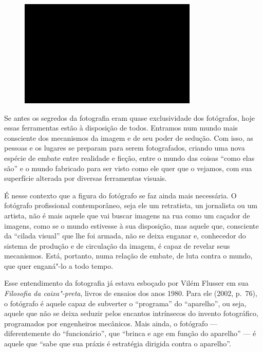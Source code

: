 \begin{figure}[!ht]

\centering
 \includegraphics[width=85mm]{./imgs/im1.jpg}
\caption{\tiny{}}

\end{figure}

Se antes os segredos da fotografia eram quase exclusividade dos fotógrafos, hoje essas ferramentas estão à disposição de todos. Entramos num mundo mais consciente dos mecanismos da imagem e de seu poder de sedução. Com isso, as pessoas e os lugares se preparam para serem fotografados, criando uma nova espécie de embate entre realidade e ficção, entre o mundo das coisas ``como elas são'' e o mundo fabricado para ser visto como ele quer que o vejamos, com sua superfície alterada por diversas ferramentas visuais. 

É nesse contexto que a figura do fotógrafo se faz ainda mais necessária. O fotógrafo profissional contemporâneo, seja ele um retratista, un jornalista ou um artista, não é mais aquele que vai buscar imagens na rua como um caçador de imagens, como se o mundo estivesse à sua disposição, mas aquele que, consciente da ``cilada visual'' que lhe foi armada, não se deixa enganar e, conhecedor do sistema de produção e de circulação da imagem, é capaz de revelar seus mecanismos. Está, portanto, numa relação de embate, de luta contra o mundo, que quer enganá"-lo a todo tempo.

Esse entendimento da fotografia já estava esboçado por Vilém Flusser em sua \emph{Filosofia da caixa"-preta}, livros de ensaios dos anos 1980. Para ele (2002, p.~76), o fotógrafo é aquele capaz de subverter o ``programa'' do ``aparelho'', ou seja, aquele que não se deixa seduzir pelos encantos intrínsecos do invento fotográfico, programados por engenheiros mecânicos. Mais ainda, o fotógrafo --- diferentemente do ``funcionário'', que ``brinca e age em função do aparelho'' ---  é aquele que ``sabe que sua práxis é estratégia dirigida contra o aparelho''.

